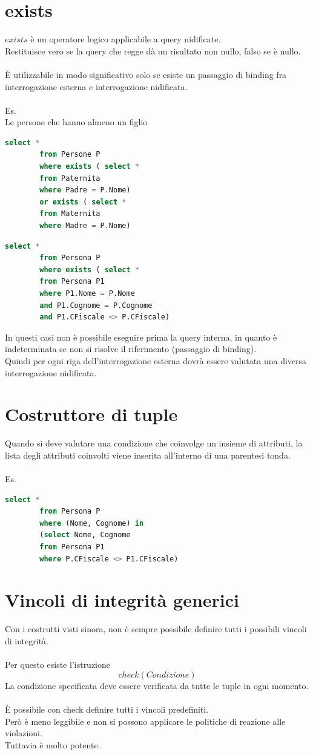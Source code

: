 \documentclass{article}
\begin{document}
	\section{exists}
	$exists$ è un operatore logico applicabile a query nidificate.\\
	Restituisce vero se la query che regge dà un risultato non nullo, falso se è nullo.\\\\
	È utilizzabile in modo significativo solo se esiste un passaggio di binding fra interrogazione esterna e interrogazione nidificata.\\\\
	Es.\\
	Le persone che hanno almeno un figlio
	\begin{lstlisting}[language=SQL]
		select *
		from Persone P
		where exists ( select *
		from Paternita
		where Padre = P.Nome)
		or exists ( select *
		from Maternita
		where Madre = P.Nome)
	\end{lstlisting}
	\begin{lstlisting}[language=SQL]
		select *
		from Persona P
		where exists ( select *
		from Persona P1
		where P1.Nome = P.Nome
		and P1.Cognome = P.Cognome
		and P1.CFiscale <> P.CFiscale)
	\end{lstlisting}
	In questi casi non è possibile eseguire prima la query interna, in quanto è indeterminata se non si risolve il riferimento (passaggio di binding). \\
	Quindi per ogni riga dell’interrogazione esterna dovrà essere valutata una diversa interrogazione nidificata.
	\section{Costruttore di tuple}
	Quando si deve valutare una condizione che coinvolge un insieme di attributi, la lista degli attributi coinvolti viene inserita all'interno di una parentesi tonda.\\\\
	Es.
	\begin{lstlisting}[language=SQL]
		select *
		from Persona P
		where (Nome, Cognome) in
		(select Nome, Cognome
		from Persona P1
		where P.CFiscale <> P1.CFiscale)
	\end{lstlisting}
	\section{Vincoli di integrità generici}
	Con i costrutti visti sinora, non è sempre possibile definire tutti i possibili vincoli di integrità.\\\\
	Per questo esiste l'istruzione
	\[check(Condizione)\]
	La condizione specificata deve essere verificata da tutte le tuple in ogni momento.\\\\
	È possibile con check definire tutti i vincoli predefiniti.\\
	Però è meno leggibile e non si possono applicare le politiche di reazione alle violazioni. \\
	Tuttavia è molto potente.
\end{document}
